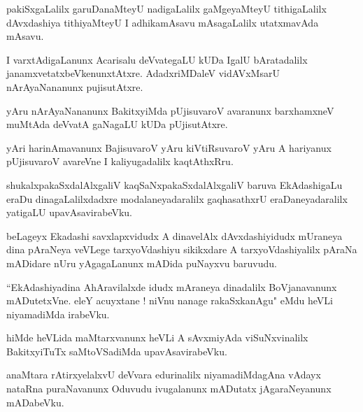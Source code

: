 \documentclass{article}
\begin{document}
\begin{mn}%
pakiSxgaLalilx garuDanaMteyU nadigaLalilx gaMgeyaMteyU tithigaLalilx dAvxdashiya tithiyaMteyU I 
adhikamAsavu mAsagaLalilx utatxmavAda mAsavu.
\end{mn}

\begin{mn}%
I varxtAdigaLanunx Acarisalu deVvategaLU kUDa IgalU bAratadalilx janamxvetatxbeVkenunxtAtxre. 
AdadxriMDaleV vidAVxMsarU nArAyaNananunx pujisutAtxre.
\end{mn}

\begin{mn}%
yAru nArAyaNananunx BakitxyiMda pUjisuvaroV avaranunx barxhamxneV muMtAda deVvatA gaNagaLU kUDa 
pUjisutAtxre.
\end{mn}

\begin{mn}%
yAri harinAmavanunx BajisuvaroV yAru kiVtiRsuvaroV yAru A hariyanux pUjisuvaroV avareVne I 
kaliyugadalilx kaqtAthxRru.
\end{mn}

\begin{mn}%
shukalxpakaSxdalAlxgaliV kaqSaNxpakaSxdalAlxgaliV baruva EkAdashigaLu eraDu dinagaLalilxdadxre 
modalaneyadaralilx gaqhasathxrU eraDaneyadaralilx yatigaLU upavAsavirabeVku.
\end{mn}

\begin{mn}%
beLageyx Ekadashi savxlapxvidudx A dinavelAlx dAvxdashiyidudx mUraneya dina pAraNeya veVLege 
tarxyoVdashiyu sikikxdare A tarxyoVdashiyalilx pAraNa mADidare nUru yAgagaLanunx mADida puNayxvu 
baruvudu.
\end{mn}

\begin{mn}%
``EkAdashiyadina AhAravilalxde idudx mAraneya dinadalilx BoVjanavanunx mADutetxVne. eleY acuyxtane 
! niVnu nanage rakaSxkanAgu" eMdu heVLi niyamadiMda irabeVku.
\end{mn}

\begin{mn}%
hiMde heVLida maMtarxvanunx heVLi A sAvxmiyAda viSuNxvinalilx BakitxyiTuTx saMtoVSadiMda 
upavAsavirabeVku.
\end{mn}

\begin{mn}%
anaMtara rAtirxyelalxvU deVvara edurinalilx niyamadiMdagAna vAdayx nataRna puraNavanunx Oduvudu 
ivugalanunx mADutatx jAgaraNeyanunx mADabeVku.
\end{mn}
\end{document}
